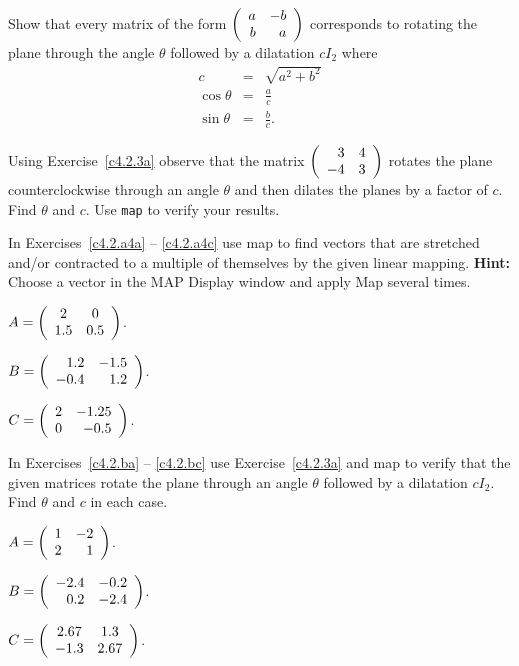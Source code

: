 \documentclass{ximera}
\begin{document}
\begin{exercise}	\label{c4.2.3a}
Show that every matrix of the form $\left(\begin{array}{rr} a & -b\\ b &a\end{array}\right)$ corresponds to
rotating the plane through the angle $\theta$ followed by a dilatation 
$cI_2$ where
\begin{eqnarray*}
c & = & \sqrt{a^2+b^2}\\
\cos\theta & = & \frac{a}{c} \\
\sin\theta & = & \frac{b}{c}.
\end{eqnarray*}
\end{exercise}

\begin{exercise}  \label{c4.2.3b}
Using Exercise~\ref{c4.2.3a} observe that the matrix
$\left(\begin{array}{rr} 3 & 4\\ -4 &3\end{array}\right)$ rotates the plane counterclockwise through
an angle $\theta$ and then dilates the planes by a factor of $c$.
Find $\theta$ and $c$.  Use {\tt map} to verify your results.
\end{exercise}


\CEXER


\noindent In Exercises~\ref{c4.2.a4a} -- \ref{c4.2.a4c} use {\sf map} to
find vectors that are stretched and/or contracted to a multiple of
themselves by the given linear mapping.  {\bf Hint:}  Choose a vector in the
{\sf MAP Display} window and apply {\sf Map} several times.
\begin{exercise} \label{c4.2.a4a}
$A=\left(\begin{array}{cc} 2 & 0\\ 1.5 &0.5\end{array}\right)$.
\end{exercise}
\begin{exercise} \label{c4.2.a4b}
$B=\left(\begin{array}{rr} 1.2 & -1.5\\ -0.4 &1.2\end{array}\right)$.
\end{exercise}
\begin{exercise} \label{c4.2.a4c}
$C=\left(\begin{array}{rr} 2 & -1.25\\ 0 &-0.5\end{array}\right)$.
\end{exercise}

\noindent In Exercises~\ref{c4.2.ba} -- \ref{c4.2.bc} use
Exercise~\ref{c4.2.3a} and {\sf map} to verify that the given matrices
rotate the plane through an angle $\theta$ followed by a dilatation $cI_2$.
Find $\theta$ and $c$ in each case.
\begin{exercise}  \label{c4.2.ba}
$A=\left(\begin{array}{rr} 1 & -2\\ 2 &1\end{array}\right)$.
\end{exercise}
\begin{exercise}  \label{c4.2.bb}
$B=\left(\begin{array}{rr} -2.4 & -0.2\\ 0.2 &-2.4\end{array}\right)$.
\end{exercise}
\begin{exercise}  \label{c4.2.bc}
$C=\left(\begin{array}{cc} 2.67 & 1.3\\ -1.3 &2.67\end{array}\right)$.
\end{exercise}
\end{document}
